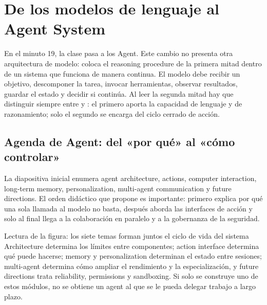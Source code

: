 \section{De los modelos de lenguaje al Agent System}

En el minuto 19, la clase pasa a los Agent. Este cambio no presenta otra arquitectura de modelo: coloca el reasoning procedure de la primera mitad dentro de un sistema que funciona de manera continua. El modelo debe recibir un objetivo, descomponer la tarea, invocar herramientas, observar resultados, guardar el estado y decidir si continúa. Al leer la segunda mitad hay que distinguir siempre entre  y : el primero aporta la capacidad de lenguaje y de razonamiento; solo el segundo se encarga del ciclo cerrado de acción.

\subsection{Agenda de Agent: del «por qué» al «cómo controlar»}

La diapositiva inicial enumera agent architecture, actions, computer interaction, long-term memory, personalization, multi-agent communication y future directions. El orden didáctico que propone es importante: primero explica por qué una sola llamada al modelo no basta, después aborda las interfaces de acción y solo al final llega a la colaboración en paralelo y a la gobernanza de la seguridad.


\begin{knowledgebox}{Lectura de la figura: los siete temas forman juntos el ciclo de vida del sistema}
Architecture determina los límites entre componentes; action interface determina qué puede hacerse; memory y personalization determinan el estado entre sesiones; multi-agent determina cómo ampliar el rendimiento y la especialización, y future directions trata reliability, permissions y sandboxing. Si solo se construye uno de estos módulos, no se obtiene un agent al que se le pueda delegar trabajo a largo plazo.
\end{knowledgebox}


